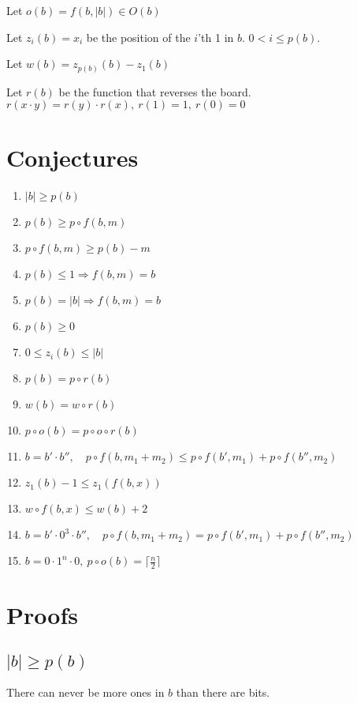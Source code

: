 \documentclass{article}
\begin{document}
\vspace{\baselineskip}
\noindent
Let $o(b) = f(b,|b|)\in O(b)$

\vspace{\baselineskip}
\noindent
Let $z_{i}(b) = x_i$ be the position of the $i$'th 1 in $b$. $0<i\le p(b)$. 

\vspace{\baselineskip}
\noindent
Let $w(b) = z_{p(b)}(b)-z_1(b)$

\vspace{\baselineskip}
\noindent
Let $r(b)$ be the function that reverses the board. $r(x\cdot y)=r(y) \cdot r(x),\ r(1) = 1,\ r(0) = 0$


\section{Conjectures}
\begin{enumerate}
    \item $|b|\ge p(b)$
    \item $p(b)\ge p\circ f(b,m)$
    \item $p\circ f(b,m)\ge p(b)-m$
    \item $p(b) \le 1 \Rightarrow f(b,m) = b$
    \item $p(b) = |b| \Rightarrow f(b,m) = b$
    \item $p(b)\ge 0$
    \item $0 \le z_i(b)\le |b|$ 
    \item $p(b) = p\circ r(b)$
    \item $w(b) = w\circ r(b)$
    \item $p\circ o(b) = p\circ o\circ r(b)$
    \item $b = b'\cdot b'',\quad p\circ f(b,m_1+m_2) \le p\circ f(b',m_1) + p\circ f(b'',m_2)$
    \item $z_1(b)-1\le z_1(f(b,x))$
    \item $w\circ f(b,x)\le w(b)+2$ 
    \item $b = b'\cdot 0^3\cdot b'',\quad p\circ f(b,m_1+m_2) = p\circ f(b',m_1) + p\circ f(b'',m_2)$
    \item $b=0\cdot 1^n\cdot 0,\ p\circ o(b) = \lceil\frac{n}{2}\rceil$ 
\end{enumerate}

\section{Proofs}
\subsection{$|b|\ge p(b)$}
There can never be more ones in $b$ than there are bits. 
\end{document}
